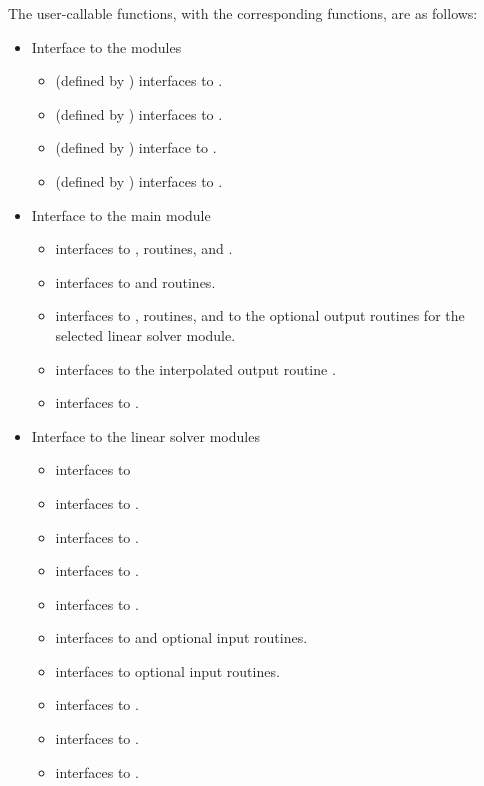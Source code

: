 The user-callable functions, with the corresponding {\cvode} functions,
are as follows:
\begin{itemize}
\item
  Interface to the {\nvector} modules
  \begin{itemize}
  \item {} (defined by {\nvecs}) 
    interfaces to .
  \item {} (defined by {\nvecp}) 
    interfaces to .
  \item {} (defined by {\nvecs})
    interface to .
  \item {}  (defined by {\nvecp})
    interfaces to .
  \end{itemize}
\item Interface to the main {\cvode} module
  \begin{itemize}
  \item {}
    interfaces to ,  routines, and .
  \item {}  
    interfaces to  and  routines.
  \item {}
    interfaces to ,  routines, and to the optional output routines 
    for the selected linear solver module.
  \item {}     
    interfaces to the interpolated output routine .
  \item {}    
    interfaces to .
  \end{itemize}  
\item Interface to the linear solver modules
  \begin{itemize}
  \item {}    
    interfaces to 
  \item {}
    interfaces to .
  \item {}
    interfaces to .
  \item {}
    interfaces to .
  \item {}
    interfaces to .
  \item {}
    interfaces to  and {\spgmr} optional input routines.
  \item {} 
    interfaces to {\spgmr} optional input routines.
  \item {}
   interfaces to .
 \item {}
   interfaces to .
 \item {}
   interfaces to .
 \end{itemize}

\end{itemize}

